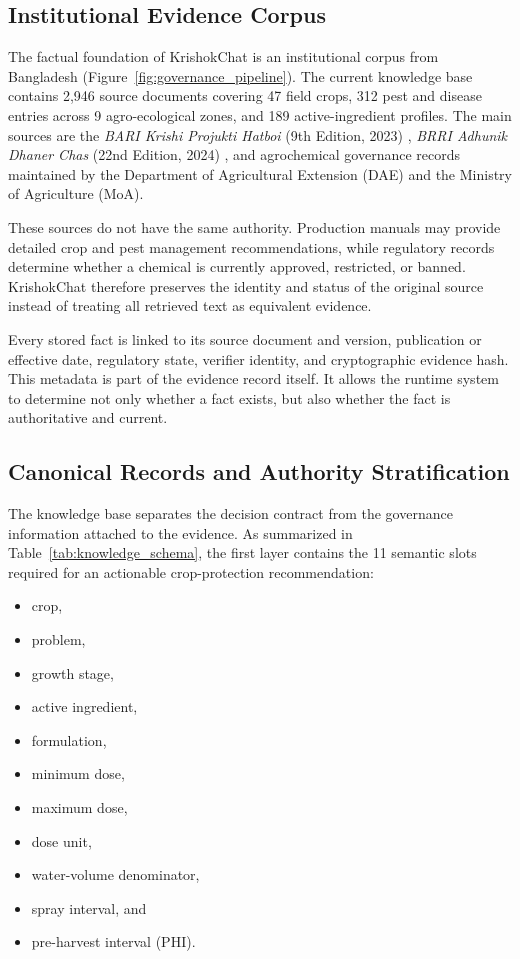 \documentclass[a4paper,fleqn]{cas-dc}
\begin{document}
\subsection{Institutional Evidence Corpus}

The factual foundation of KrishokChat is an institutional corpus from Bangladesh (Figure~\ref{fig:governance_pipeline}). The current knowledge base contains 2{,}946 source documents covering 47 field crops, 312 pest and disease entries across 9 agro-ecological zones, and 189 active-ingredient profiles. The main sources are the \textit{BARI Krishi Projukti Hatboi} (9th Edition, 2023) \citep{bari_handbook2023}, \textit{BRRI Adhunik Dhaner Chas} (22nd Edition, 2024) \citep{brri_handbook2024}, and agrochemical governance records maintained by the Department of Agricultural Extension (DAE) and the Ministry of Agriculture (MoA).

These sources do not have the same authority. Production manuals may provide detailed crop and pest management recommendations, while regulatory records determine whether a chemical is currently approved, restricted, or banned. KrishokChat therefore preserves the identity and status of the original source instead of treating all retrieved text as equivalent evidence.

Every stored fact is linked to its source document and version, publication or effective date, regulatory state, verifier identity, and cryptographic evidence hash. This metadata is part of the evidence record itself. It allows the runtime system to determine not only whether a fact exists, but also whether the fact is authoritative and current.

\subsection{Canonical Records and Authority Stratification}

The knowledge base separates the decision contract from the governance information attached to the evidence. As summarized in Table~\ref{tab:knowledge_schema}, the first layer contains the 11 semantic slots required for an actionable crop-protection recommendation:
\begin{itemize}
    \item crop,
    \item problem,
    \item growth stage,
    \item active ingredient,
    \item formulation,
    \item minimum dose,
    \item maximum dose,
    \item dose unit,
    \item water-volume denominator,
    \item spray interval, and
    \item pre-harvest interval (PHI).
\end{itemize}
\end{document}
